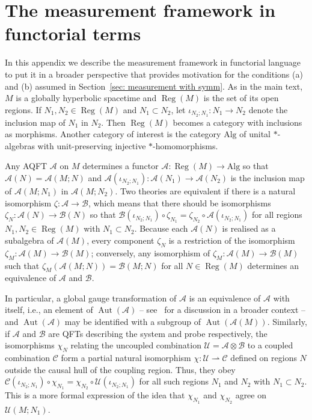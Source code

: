 \documentclass[sn-mathphys-num]{sn-jnl}%
\newcommand{\Af}{\mathscr{A}}
\newcommand{\Bf}{\mathscr{B}}
\newcommand{\Cf}{\mathscr{C}}
\newcommand{\Uf}{\mathscr{U}}
\DeclareMathOperator{\Aut}{Aut}
\DeclareMathOperator{\Reg}{Reg}
\newcommand{\Alg}{\mathrm{Alg}}
\numberwithin{equation}{section}
\theoremstyle{thmstyleone}%
\theoremstyle{thmstyletwo}%
\theoremstyle{thmstylethree}%
\begin{document}
\appendix
\section{The measurement framework in functorial terms}\label{appx:functorial} 

In this appendix we describe the measurement framework in functorial language to put it in a broader perspective that provides motivation for the conditions (a) and (b) assumed in Section~\ref{sec: measurement with symm}. As in the main text, $M$ is a globally hyperbolic spacetime and $\Reg(M)$ is the set of its open regions. If $N_1,N_2\in\Reg(M)$ and $N_1\subset N_2$, let $\iota_{N_2;N_1}:N_1\to N_2$ denote the inclusion map of $N_1$ in $N_2$. Then $\Reg(M)$ becomes a category with inclusions as morphisms. Another category of interest is the category $\Alg$ of unital $*$-algebras with unit-preserving injective $*$-homomorphisms.

Any AQFT $\Af$ on $M$ determines a functor $\Af:\Reg(M)\to\Alg$ so that
$\Af(N)=\Af(M;N)$ and $\Af(\iota_{N_2;N_1}):\Af(N_1)\to\Af(N_2)$ is the inclusion map of $\Af(M;N_1)$ in $\Af(M;N_2)$. Two theories are equivalent if there is a natural isomorphism
$\zeta:\Af\to\Bf$, which means that there should be isomorphisms $\zeta_N:\Af(N)\to\Bf(N)$ so that $\Bf(\iota_{N_2;N_1})\circ \zeta_{N_1}= \zeta_{N_2}\circ \Af(\iota_{N_2;N_1})$ for all regions $N_1,N_2\in\Reg(M)$ with $N_1\subset N_2$. Because each $\Af(N)$ is realised as a subalgebra of $\Af(M)$, every component $\zeta_N$ is a restriction of the isomorphism $\zeta_M:\Af(M)\to\Bf(M)$; conversely, any isomorphism of $\zeta_M:\Af(M)\to\Bf(M)$ such that
$\zeta_M(\Af(M;N))= \Bf(M;N)$ for all $N\in\Reg(M)$ determines an equivalence of $\Af$ and $\Bf$.

In particular, a global gauge transformation of $\Af$ is an equivalence of $\Af$ with itself, i.e., an element of $\Aut(\Af)$ -- see~\cite{Fewster:gauge} for a discussion in a broader context -- and $\Aut(\Af)$ may be identified with a subgroup of $\Aut(\Af(M))$.
Similarly, if $\Af$ and $\Bf$ are QFTs describing the system and probe respectively, the isomorphisms $\chi_N$ relating the uncoupled combination $\Uf=\Af\otimes\Bf$ to a coupled combination $\Cf$ form a partial natural isomorphism $\chi:\Uf\rightharpoonup\Cf$ defined on regions $N$ outside the causal hull of the coupling region. Thus, they obey $\Cf(\iota_{N_2;N_1})\circ \chi_{N_1}= \chi_{N_2}\circ\Uf(\iota_{N_2;N_1})$ for all such regions $N_1$ and $N_2$ with $N_1\subset N_2$. This is a more formal expression of the idea that $\chi_{N_1}$ and $\chi_{N_2}$ agree on $\Uf(M;N_1)$.
\end{document}
